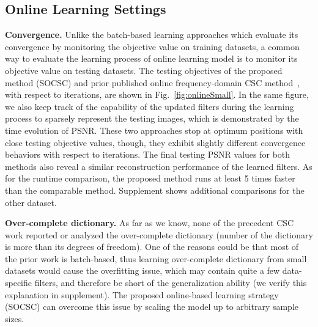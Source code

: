 \subsection{Online Learning Settings}

{\bfseries Convergence.} Unlike the batch-based learning approaches which evaluate its convergence by monitoring the objective value on training datasets, a common way to evaluate the learning process of online learning model is to monitor its objective value on testing datasets. The testing objectives of the proposed method (SOCSC) and prior published online frequency-domain CSC method~\cite{liu-2018-first}, with respect to iterations, are shown in Fig.\ \ref{fig:onlineSmall}. In the same figure, we also keep track of the capability of the updated filters during the learning process to sparsely represent the testing images, which is demonstrated by the time evolution of PSNR. These two approaches stop at optimum positions with close testing objective values, though, they exhibit slightly different convergence behaviors with respect to iterations. The final testing PSNR values for both methods also reveal a similar reconstruction performance of the learned filters. As for the runtime comparison, the proposed method runs at least 5 times faster than the comparable method. Supplement shows additional comparisons for the other dataset.


{\bfseries Over-complete dictionary.} As far as we know, none of the precedent CSC work reported or analyzed the over-complete dictionary (number of the dictionary is more than its degrees of freedom). One of the reasons could be that most of the prior work is batch-based, thus learning over-complete dictionary from small datasets would cause the overfitting issue, which may contain quite a few data-specific filters, and therefore be short of the generalization ability (we verify this explanation in supplement). The proposed online-based learning strategy (SOCSC) can overcome this issue by scaling the model up to arbitrary sample sizes.

